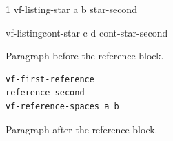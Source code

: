 \documentclass{article}
\begin{document}
\begin{listing*}{1}
vf-listing-star a  b
star-second
\end{listing*}
\begin{listingcont*}
vf-listingcont-star c  d
cont-star-second
\end{listingcont*}
Paragraph before the reference block.
\begin{verbatim}
vf-first-reference
reference-second
vf-reference-spaces a b
\end{verbatim}
Paragraph after the reference block.
\end{document}
